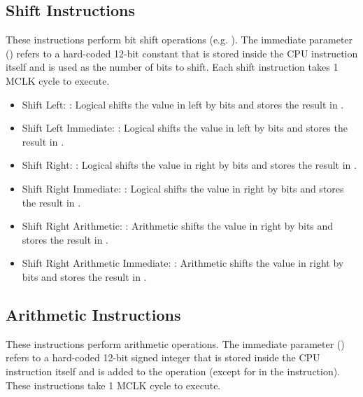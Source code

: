 \documentclass[11pt,pdftex,portrait,letterpaper]{article}
\begin{document}
\subsection{Shift Instructions}

These instructions perform bit shift operations (e.g. \cinline{<<}). The immediate parameter () refers to a hard-coded 12-bit constant that is stored inside the CPU instruction itself and is used as the number of bits to shift. Each shift instruction takes 1 MCLK cycle to execute.

\begin{itemize}
	\item Shift Left: : Logical shifts the value in  left by  bits and stores the result in .
	\item Shift Left Immediate: : Logical shifts the value in  left by  bits and stores the result in .
	\item Shift Right: : Logical shifts the value in  right by  bits and stores the result in .
	\item Shift Right Immediate: : Logical shifts the value in  right by  bits and stores the result in .
	\item Shift Right Arithmetic: : Arithmetic shifts the value in  right by  bits and stores the result in .
	\item Shift Right Arithmetic Immediate: : Arithmetic shifts the value in  right by  bits and stores the result in .
\end{itemize}

\subsection{Arithmetic Instructions}

These instructions perform arithmetic operations. The immediate parameter () refers to a hard-coded 12-bit signed integer that is stored inside the CPU instruction itself and is added to the operation (except for in the  instruction). These instructions take 1 MCLK cycle to execute.
\end{document}
